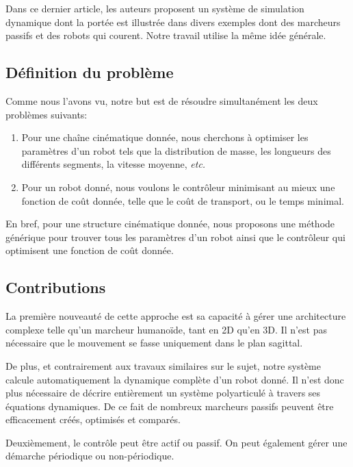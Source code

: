 \documentclass[french,A4paper,]{book}
\providecommand{\tightlist}{%
  \setlength{\itemsep}{0pt}\setlength{\parskip}{0pt}}
\begin{document}
Dans ce dernier article, les auteurs proposent un système de simulation
dynamique dont la portée est illustrée dans divers exemples dont des
marcheurs passifs et des robots qui courent. Notre travail utilise la
même idée générale.

\subsection{Définition du problème}\label{duxe9finition-du-probluxe8me}

Comme nous l'avons vu, notre but est de résoudre simultanément les deux
problèmes suivants:

\begin{enumerate}
\def\labelenumi{\arabic{enumi}.}
\tightlist
\item
  Pour une chaîne cinématique donnée, nous cherchons à optimiser les
  paramètres d'un robot tels que la distribution de masse, les longueurs
  des différents segments, la vitesse moyenne, \emph{etc.}
\item
  Pour un robot donné, nous voulons le contrôleur minimisant au mieux
  une fonction de coût donnée, telle que le coût de transport, ou le
  temps minimal.
\end{enumerate}

En bref, pour une structure cinématique donnée, nous proposons une
méthode générique pour trouver tous les paramètres d'un robot ainsi que
le contrôleur qui optimisent une fonction de coût donnée.

\subsection{Contributions}\label{contributions}

La première nouveauté de cette approche est sa capacité à gérer une
architecture complexe telle qu'un marcheur humanoïde, tant en 2D qu'en
3D. Il n'est pas nécessaire que le mouvement se fasse uniquement dans le
plan sagittal.

De plus, et contrairement aux travaux similaires sur le sujet, notre
système calcule automatiquement la dynamique complète d'un robot donné.
Il n'est donc plus nécessaire de décrire entièrement un système
polyarticulé à travers ses équations dynamiques. De ce fait de nombreux
marcheurs passifs peuvent être efficacement créés, optimisés et
comparés.

Deuxièmement, le contrôle peut être actif ou passif. On peut également
gérer une démarche périodique ou non-périodique.
\end{document}
